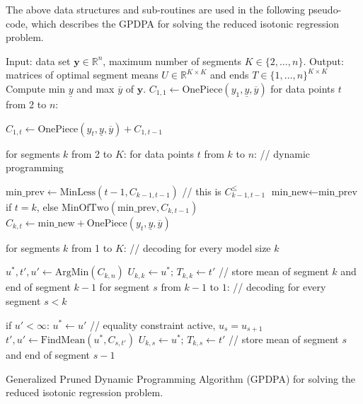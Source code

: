 \documentclass{article}
\newcommand{\FCC}{C}
\newcommand{\RR}{\mathbb R}
\begin{document}
The above data structures and sub-routines are used in the following
pseudo-code, which describes the GPDPA for solving the reduced
isotonic regression problem.
\begin{algorithm}[H]
\begin{algorithmic}[1]
\STATE Input: data set $\mathbf y\in\RR^n$, maximum number of segments $K\in\{2,\dots, n\}$.
\STATE Output: matrices of optimal segment means $U\in\RR^{K\times K}$ 
and ends $T\in\{1,\dots,n\}^{K\times K}$
\STATE Compute min $\underline y$ and max $\overline y$ of $\mathbf y$.
\label{line:min-max}
\STATE $\FCC_{1,1}\gets \text{OnePiece}(y_1, \underline y, \overline y)$
\label{line:init-1}
\STATE for data points $t$ from 2 to $n$:
\begin{ALC@g}
  \STATE $\FCC_{1,t}\gets \text{OnePiece}(y_t, \underline y, \overline y) + \FCC_{1,t-1}$
\label{line:init-t}
\end{ALC@g}
\STATE for segments $k$ from 2 to $K$: for data points $t$ from $k$ to $n$: // dynamic programming
\label{line:for-k-t}
\begin{ALC@g}
  \STATE $\text{min\_prev}\gets \text{MinLess}(t-1, \FCC_{k-1,t-1})$ // this is $\FCC_{k-1,t-1}^\leq$
  \label{line:MinLess}
    \STATE $\text{min\_new}\gets\text{min\_prev}$ if $t=k$, 
else $\text{MinOfTwo}(\text{min\_prev}, \FCC_{k, t-1})$
  \label{line:MinOfTwo}
  \STATE $\FCC_{k,t}\gets \text{min\_new} + \text{OnePiece}(y_t, \underline y, \overline y)$
  \label{line:AddNew}
\end{ALC@g}
\STATE for segments $k$ from 1 to $K$: // decoding for every model size $k$
\label{line:for-k-decoding}
\begin{ALC@g}
  \STATE $u^*,t',u'\gets \text{ArgMin}(\FCC_{k,n})$
  \label{line:ArgMin}
  \STATE $U_{k,k}\gets u^*;\, T_{k,k}\gets t'$ // store mean of segment $k$ and end of segment $k-1$
  \label{line:decode-kk}
  \STATE for segment $s$ from $k-1$ to $1$: // decoding for every segment $s<k$
  \label{line:for-s-decoding}
  \begin{ALC@g}
    \STATE if $u' < \infty$: $u^*\gets u'$ // equality constraint active, $u_s = u_{s+1}$
    \label{line:equality-constraint-active}
    \STATE $t',u'\gets\text{FindMean}(u^*, \FCC_{s,t'})$
    \label{line:FindMean}
    \STATE $U_{k,s}\gets u^*;\, T_{k,s}\gets t'$ // store mean of segment $s$ and end of segment $s-1$
    \label{line:decode-ks}
  \end{ALC@g}
\end{ALC@g}
\caption{\label{algo:SNIR}Generalized Pruned Dynamic Programming
  Algorithm (GPDPA) for solving the reduced isotonic regression
  problem.}
\end{algorithmic}
\end{algorithm}
\end{document}

